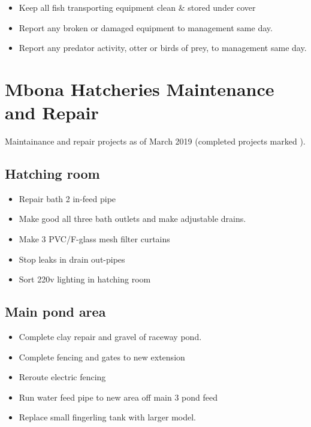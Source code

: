 \begin{itemize}
\item Keep all fish transporting equipment clean \& stored under cover 
\item Report any broken or damaged equipment to management same day.
\item Report any predator activity, otter or birds of prey, to management same day.
\end{itemize}





\newpage
\section{Mbona Hatcheries Maintenance and Repair}

Maintainance and repair projects as of March 2019 (completed projects marked \checkmark).

\subsection{Hatching room}     

\begin{itemize}
\item Repair bath 2 in-feed pipe
\item Make good all three bath outlets and make adjustable drains. 
\item Make 3 PVC/F-glass mesh filter curtains  
\item Stop leaks in drain out-pipes
\item Sort 220v lighting in hatching room
\end{itemize}

\subsection{Main pond area}     
\begin{itemize}
\item Complete clay repair and gravel of raceway pond.    
\item Complete fencing and gates to new extension   \checkmark
\item Reroute electric fencing \checkmark
\item Run water feed pipe to new area off main 3 pond feed \checkmark
\item Replace small fingerling tank with larger model.
\end{itemize}

